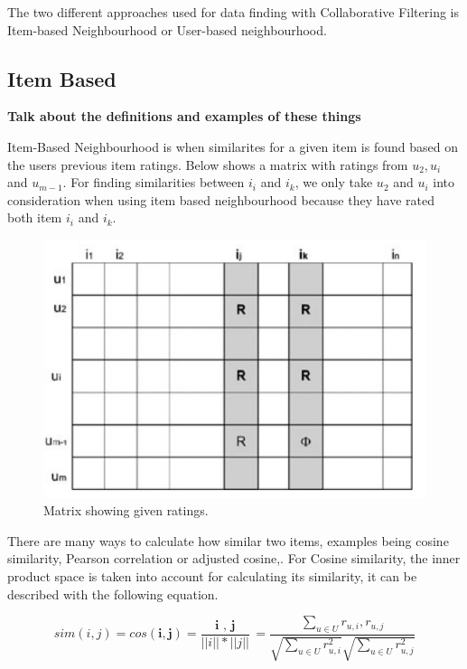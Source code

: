 The two different approaches used for data finding with Collaborative Filtering is Item-based Neighbourhood or User-based neighbourhood. 

\subsection{Item Based}

\textbf{Talk about the definitions and examples of these things \citep{ricci_recommender_2011}}

Item-Based Neighbourhood is when similarites for a given item is found based on the users previous item ratings. Below shows a matrix with ratings from  $u_{2}, u_{i}$ and $u_{m-1}$. For finding similarities between $i_{i}$ and $i_{k}$, we only take $u_{2}$ and  $u_{i}$ into consideration when using item based neighbourhood because they have rated both item $i_{i}$ and $i_{k}$.  

\begin{figure}[H]
	\includegraphics[scale=0.65]{images/neigbourhood_based}
	\centering
	\caption{Matrix showing given ratings. \citep{celma_recommendation_2010}} 
\end{figure}

There are many ways to calculate how similar two items, examples being cosine similarity, Pearson correlation or adjusted cosine,. For Cosine similarity, the inner product space is taken into account for calculating its similarity, it can be described with the following equation.

\begin{equation}
		sim(i , j) = cos( \textbf{i}, \textbf{j} ) = \frac{ \textbf{ i }, \textbf{ j }}{ || i || * || j || } = \frac{ \sum_{ u \in U } r_{ u, i }, r_{ u, j }} { \sqrt{ \sum _{  u \in U } r^{2}_{ u , i}} \sqrt{ \sum _{  u \in U } r^{2}_{ u , j}}}
\end{equation}

